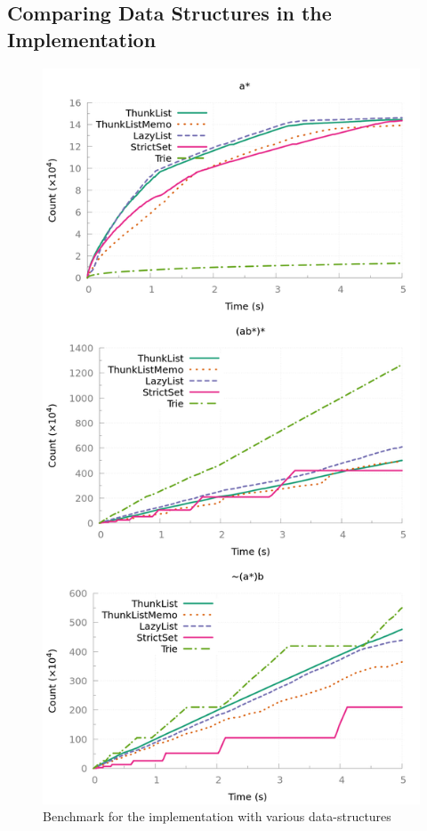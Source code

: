 \subsection{Comparing Data Structures in the \ocaml Implementation}
\label{sec:bench:ocaml}
\begin{figure}[!t]
  \centering
  \includegraphics[width=\linewidth]{measure/ocaml_all.png}
  \caption{Benchmark for the \ocaml implementation with various data-structures}
  \label{bench:ocaml:all}
\end{figure}

